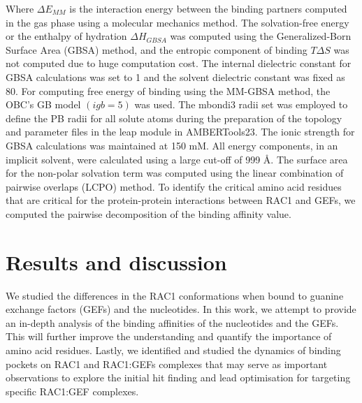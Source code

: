 \documentclass[12pt, a4paper]{achemso}
\begin{document}
Where  \({\Delta}E_{MM}\) is the interaction energy between the binding partners computed in the gas phase using a molecular mechanics method.  The solvation-free energy or the enthalpy of hydration \({\Delta}H_{GBSA}\)  was computed using the Generalized-Born Surface Area (GBSA) method, and the entropic component of binding \(T{\Delta}S\) was not computed due to huge computation cost. The internal dielectric constant for GBSA calculations was set to 1 and the solvent dielectric constant was fixed as 80. For computing free energy of binding using the MM-GBSA method, the OBC’s GB model\cite{igb5} $ (igb = 5) $ was used. The mbondi3 radii set was employed to define the PB radii for all solute atoms during the preparation of the topology and parameter files in the leap module in AMBERTools23. The ionic strength for  GBSA calculations was maintained at 150 mM. All energy components, in an implicit solvent, were calculated using a large cut-off of 999 Å. The surface area for the non-polar solvation term was computed using the linear combination of pairwise overlaps (LCPO) method\cite{lcpo}. To identify the critical amino acid residues that are critical for the protein-protein interactions between RAC1 and GEFs, we computed the pairwise decomposition of the binding affinity value. 

\section{Results and discussion} 
We studied the differences in the RAC1 conformations when bound to guanine exchange factors (GEFs) and the nucleotides.  In this work, we attempt to provide an in-depth analysis of the binding affinities of the nucleotides and the GEFs. This will further improve the understanding and quantify the importance of amino acid residues. Lastly, we identified and studied the dynamics of binding pockets on RAC1 and RAC1:GEFs complexes that may serve as important observations to explore the initial hit finding and lead optimisation for targeting specific RAC1:GEF complexes. 
\end{document}
